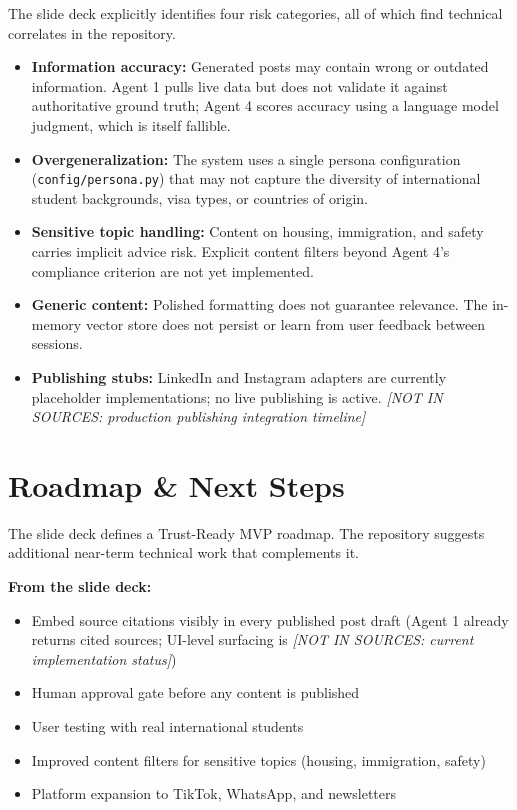 \documentclass[12pt, letterpaper]{article}
\begin{document}
The slide deck explicitly identifies four risk categories, all of which find
technical correlates in the repository.

\begin{itemize}[leftmargin=1.5em]
  \item \textbf{Information accuracy:} Generated posts may contain wrong or outdated
    information. Agent 1 pulls live data but does not validate it against authoritative
    ground truth; Agent 4 scores accuracy using a language model judgment, which is
    itself fallible.
  \item \textbf{Overgeneralization:} The system uses a single persona configuration
    (\texttt{config/persona.py}) that may not capture the diversity of international
    student backgrounds, visa types, or countries of origin.
  \item \textbf{Sensitive topic handling:} Content on housing, immigration, and safety
    carries implicit advice risk. Explicit content filters beyond Agent 4's compliance
    criterion are not yet implemented.
  \item \textbf{Generic content:} Polished formatting does not guarantee relevance.
    The in-memory vector store does not persist or learn from user feedback between
    sessions.
  \item \textbf{Publishing stubs:} LinkedIn and Instagram adapters are currently
    placeholder implementations; no live publishing is active.
    \emph{[NOT IN SOURCES: production publishing integration timeline]}
\end{itemize}

\section{Roadmap \& Next Steps}

The slide deck defines a Trust-Ready MVP roadmap. The repository suggests additional
near-term technical work that complements it.

\textbf{From the slide deck:}
\begin{itemize}[leftmargin=1.5em]
  \item Embed source citations visibly in every published post draft (Agent 1 already
    returns cited sources; UI-level surfacing is
    \emph{[NOT IN SOURCES: current implementation status]})
  \item Human approval gate before any content is published
  \item User testing with real international students
  \item Improved content filters for sensitive topics (housing, immigration, safety)
  \item Platform expansion to TikTok, WhatsApp, and newsletters
\end{itemize}
\end{document}
